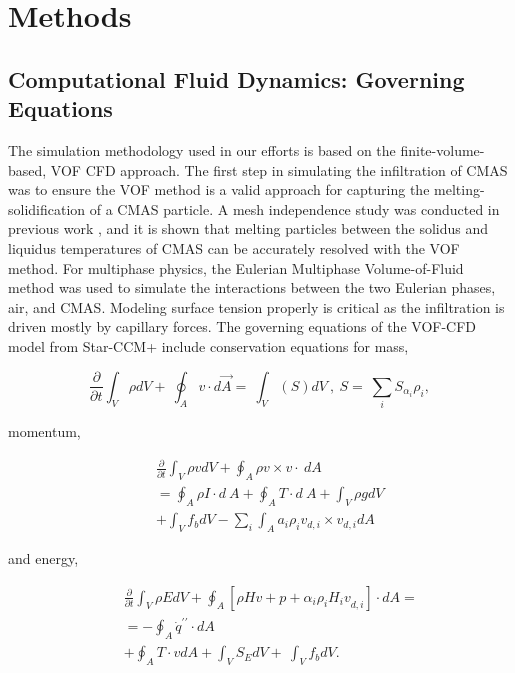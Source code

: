 \documentclass[%
 aip,
 amsmath,amssymb,
 reprint,%
]{revtex4-1}
\begin{document}
\section{Methods}
\label{sec:methods}

\subsection{Computational Fluid Dynamics: Governing Equations}
The simulation methodology used in our efforts\cite{Cavainolo2023, Cavainolo2022} is based on the finite-volume-based, VOF CFD approach. The first step in simulating the infiltration of CMAS was to ensure the VOF method is a valid approach for capturing the melting-solidification of a CMAS particle. A mesh independence study was conducted in previous work \cite{Cavainolo2022}, and it is shown that melting particles between the solidus and liquidus temperatures of CMAS can be accurately resolved with the VOF method. For multiphase physics, the Eulerian Multiphase Volume-of-Fluid method was used to simulate the interactions between the two Eulerian phases, air, and CMAS.  Modeling surface tension properly is critical as the infiltration is driven mostly by capillary forces. The governing equations of the VOF-CFD model from  Star-CCM+ \cite{starccm} include conservation equations for mass,

\begin{equation}
\label{consMass:equation}
    \frac{\partial}{\partial t}\int_{V}\rho dV+\ \oint_{A}{v\cdot d\Vec{A}}=\ \int_{V}\left(S\right)dV\ ,\ S=\ \sum_{i}{S_{\alpha_i}\rho_i},
\end{equation}

\noindent momentum,

\begin{eqnarray}
\label{consMomentum:equation}
    &&\frac{\partial}{\partial t}\int_{V}\rho vdV+\oint_{A}{\rho v\times v}\cdot\ dA \nonumber\\
    &&=\oint_{A}{\rho I\cdot d\ A}+\oint_{A}{T\cdot d\ A}+\int_{V}\rho gdV\ \\
    &&+\int_{V}{f_bdV}-\sum_{i}\int_{A}{a_i\rho_iv_{d,i}\times v_{d,i}dA}\nonumber
\end{eqnarray}


\noindent and energy,

\begin{eqnarray}
\label{consEnergy:equation}
   &&\frac{\partial}{\partial t}\int_{V}\rho EdV+\oint_{A}\left[\rho Hv+p+\alpha_i\rho_i{H_iv}_{d,i}\right]\cdot dA=\nonumber \\
   &&=-\oint_{A}{{\dot{q}}^{\prime\prime}\cdot d A} \\
   &&+\oint_{A}{T\cdot v d A}+\int_{V}{S_EdV}+\ \int_{V}{f_bdV}.\nonumber
\end{eqnarray}
\end{document}
